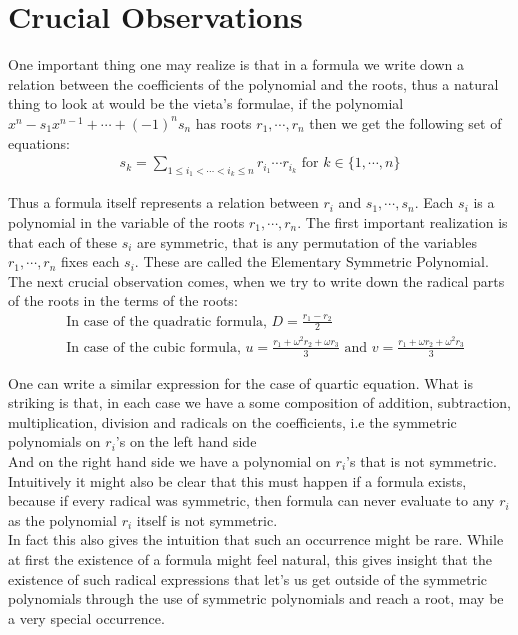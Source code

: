 \eject

\section{Crucial Observations}

One important thing one may realize is that in a formula we write down a relation between the coefficients of the polynomial and the roots, thus a natural thing to look at would be the vieta's formulae, if the polynomial $x^n-s_1x^{n-1}+\cdots+(-1)^ns_n$ has roots $r_1,\cdots,r_n$ then we get the following set of equations:
\begin{align*}
s_k=\sum_{1\leq i_1<\cdots<i_k\leq n}{r_{i_1}\cdots r_{i_k}} \text{ for } k\in\{1,\cdots,n\}
\end{align*}

Thus a formula itself represents a relation between $r_i$ and $s_1,\cdots,s_n$. Each $s_i$ is a polynomial in the variable of the roots $r_1,\cdots,r_n$. The first important realization is that each of these $s_i$ are symmetric, that is any permutation of the variables $r_1,\cdots,r_n$ fixes each $s_i$. These are called the Elementary Symmetric Polynomial.\\

The next crucial observation comes, when we try to write down the radical parts of the roots in the terms of the roots:
\begin{align*}
&\text{In case of the quadratic formula, } D=\frac{r_1-r_2}{2}\\
&\text{In case of the cubic formula, } u=\frac{r_1+\omega^2 r_2+\omega r_3}{3} \text{ and } v=\frac{r_1+\omega r_2+\omega^2 r_3}{3}
\end{align*}

One can write a similar expression for the case of quartic equation. What is striking is that, in each case we have a some composition of addition, subtraction, multiplication, division and radicals on the coefficients, i.e the symmetric polynomials on $r_i$'s on the left hand side\\
And on the right hand side we have a polynomial on $r_i$'s that is not symmetric. Intuitively it might also be clear that this must happen if a formula exists, because if every radical was symmetric, then formula can never evaluate to any $r_i$ as the polynomial $r_i$ itself is not symmetric.\\

In fact this also gives the intuition that such an occurrence might be rare. While at first the existence of a formula might feel natural, this gives insight that the existence of such radical expressions that let's us get outside of the symmetric polynomials through the use of symmetric polynomials and reach a root, may be a very special occurrence.\\

